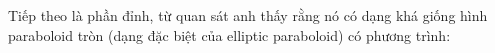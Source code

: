 \documentclass[preview]{standalone}
\begin{document}
\begin{center}
Tiếp theo là phần đỉnh, từ quan sát anh thấy rằng nó có dạng khá giống hình paraboloid tròn (dạng đặc biệt của elliptic paraboloid) có phương trình:
\end{center}
\end{document}
